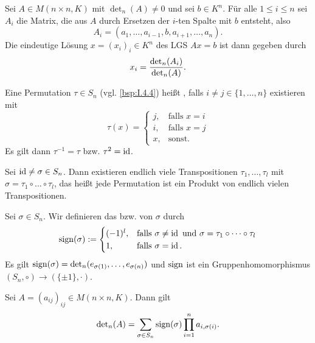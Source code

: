 \setcounter{definition}{7}
\begin{satz}
	\label{satz:I.14.8}
	Sei $A \in M(n \times n,K)$ mit $\det_n(A) \neq 0$ und sei $b \in K^n$.
	Für alle $1 \leq i \leq n$ sei $A_i$ die Matrix, die aus $A$ durch Ersetzen der $i$-ten Spalte mit $b$ entsteht, also
	\[
		A_i = (a_1,\dots,a_{i-1},b,a_{i+1},\dots,a_n).
	\]
	Die eindeutige Lösung $x = (x_i)_i \in K^n$ des LGS $Ax = b$ ist dann gegeben durch
	\[
		x_i = \frac{\operatorname{\det\,\!}_n(A_i)}{\operatorname{\det\,\!}_n(A)}.
	\]
\end{satz}

\setcounter{definition}{9}
\begin{definition}[Transposition]
	\label{def:I.14.10}
	Eine Permutation $\tau \in S_n$ (vgl. \autoref{bsp:I.4.4}) heißt , falls $i \neq j \in \{1,\dots,n\}$ existieren mit
	\[
		\tau(x) = \begin{cases}
			j, & \text{falls } x = i \\
			i, & \text{falls } x = j \\
			x, & \text{sonst.}
		\end{cases}
	\]
	Es gilt dann $\tau^{-1} = \tau$ bzw. $\tau^2 = \operatorname{id}$.
\end{definition}

\begin{lemma}
	\label{lemma:I.14.11}
	Sei $\operatorname{id} \neq \sigma \in S_n$.
	Dann existieren endlich viele Transpositionen $\tau_1,\dots,\tau_l$ mit $\sigma = \tau_1 \circ \dots \circ \tau_l$, das heißt jede Permutation ist ein Produkt von endlich vielen Transpositionen.
\end{lemma}

\setcounter{definition}{12}
\begin{definition}[Signum]
	\label{def:I.14.13}
	Sei $\sigma \in S_n$.
	Wir definieren das  bzw.  von $\sigma$ durch
	\[
		\operatorname{sign}(\sigma) := \begin{cases}
			(-1)^l, & \text{falls } \sigma \neq \operatorname{id} \text{ und } \sigma = \tau_1 \circ \dots \circ \tau_l \\
			1, & \text{falls } \sigma = \operatorname{id}.
		\end{cases}
	\]
	Es gilt $\operatorname{sign}(\sigma) = \operatorname{\det\,\!}_n(e_{\sigma(1)},\dots,e_{\sigma(n)})$ und $\operatorname{sign}$ ist ein Gruppenhomomorphismus $(S_n,\circ) \rightarrow(\{\pm 1\},\cdot)$.
\end{definition}

\setcounter{definition}{14}
\begin{satz}
	\label{satz:I.14.15}
	Sei $A = (a_{ij})_{ij} \in M(n \times n,K)$.
	Dann gilt 
	\[
		\operatorname{\det\,\!}_n(A) = \sum_{\sigma \in S_n}^{} \operatorname{sign}(\sigma) \prod_{i=1}^{n} a_{i,\sigma(i)}.
	\]
\end{satz}
\newpage